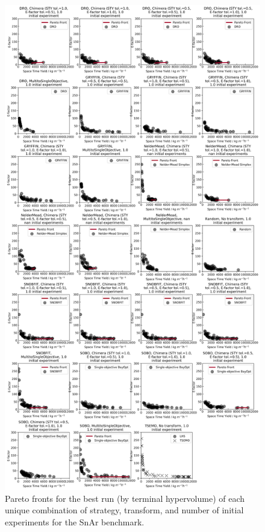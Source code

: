 \begin{figure}[p]
    \centering
    \includegraphics[height=0.8\textheight]{gfx/Appendix/snar_pareto_fronts.png}
    \caption{Pareto fronts for the best run (by terminal hypervolume) of each unique combination of strategy, transform, and number of initial experiments for the SnAr benchmark.}
    \label{fig:snar_pareto_fronts}
\end{figure}


